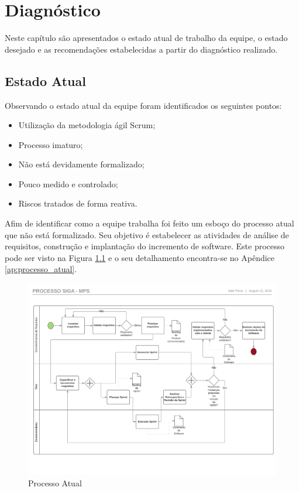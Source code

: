 \chapter{Diagnóstico}

Neste capítulo são apresentados o estado atual de trabalho da equipe, o estado desejado e as recomendações estabelecidas
a partir do diagnóstico realizado.

\section{Estado Atual}

Observando o estado atual da equipe foram identificados os seguintes pontos:

\begin{itemize}
  \item Utilização da metodologia ágil Scrum;
  \item Processo imaturo;
  \item Não está devidamente formalizado;
  \item Pouco medido e controlado;
  \item Riscos tratados de forma reativa.
\end{itemize}

Afim de identificar como a equipe trabalha foi feito um esboço do processo atual que não está formalizado. Seu objetivo é estabelecer
as atividades de análise de requisitos, construção e implantação do incremento de software. Este processo pode ser visto na 
Figura \ref{fig:processo_atual} e o seu detalhamento encontra-se no Apêndice \ref{ap:processo_atual}.


\begin{figure}[!ht]
\centering
\includegraphics[scale=0.5]{figuras/processo_atual.png}
\caption{Processo Atual}
\label{fig:processo_atual}
\end{figure}

